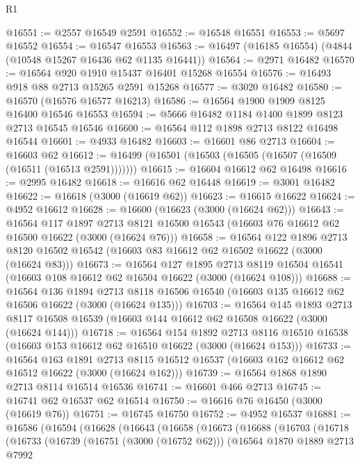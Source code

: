 \begin{lexlean}{R1}
\begin{coremodule}
@16551 := @2557 @16549 @2591
@16552 := @16548 @16551
@16553 := @5697 @16552
@16554 := @16547 @16553
@16563 := @16497 (@16185 @16554) (@4844 (@10548 @15267 @16436 @62 @1135 @16441))
@16564 := @2971 @16482
@16570 := @16564 @920 @1910 @15437 @16401 @15268 @16554
@16576 := @16493 @918 @88 @2713 @15265 @2591 @15268
@16577 := @3020 @16482
@16580 := @16570 (@16576 @16577 @16213)
@16586 := @16564 @1900 @1909 @8125 @16400 @16546 @16553
@16594 := @5666 @16482 @1184 @1400 @1899 @8123 @2713 @16545 @16546
@16600 := @16564 @112 @1898 @2713 @8122 @16498 @16544
@16601 := @4933 @16482
@16603 := @16601 @86 @2713
@16604 := @16603 @62
@16612 := @16499 (@16501 (@16503 (@16505 (@16507 (@16509 (@16511 (@16513 @2591)))))))
@16615 := @16604 @16612 @62 @16498
@16616 := @2995 @16482
@16618 := @16616 @62 @16448
@16619 := @3001 @16482
@16622 := @16618 (@3000 (@16619 @62))
@16623 := @16615 @16622
@16624 := @4952 @16612
@16628 := @16600 (@16623 (@3000 (@16624 @62)))
@16643 := @16564
    @117
    @1897
    @2713
    @8121
    @16500
    @16543
    (@16603 @76 @16612 @62 @16500 @16622 (@3000 (@16624 @76)))
@16658 := @16564
    @122
    @1896
    @2713
    @8120
    @16502
    @16542
    (@16603 @83 @16612 @62 @16502 @16622 (@3000 (@16624 @83)))
@16673 := @16564
    @127
    @1895
    @2713
    @8119
    @16504
    @16541
    (@16603 @108 @16612 @62 @16504 @16622 (@3000 (@16624 @108)))
@16688 := @16564
    @136
    @1894
    @2713
    @8118
    @16506
    @16540
    (@16603 @135 @16612 @62 @16506 @16622 (@3000 (@16624 @135)))
@16703 := @16564
    @145
    @1893
    @2713
    @8117
    @16508
    @16539
    (@16603 @144 @16612 @62 @16508 @16622 (@3000 (@16624 @144)))
@16718 := @16564
    @154
    @1892
    @2713
    @8116
    @16510
    @16538
    (@16603 @153 @16612 @62 @16510 @16622 (@3000 (@16624 @153)))
@16733 := @16564
    @163
    @1891
    @2713
    @8115
    @16512
    @16537
    (@16603 @162 @16612 @62 @16512 @16622 (@3000 (@16624 @162)))
@16739 := @16564 @1868 @1890 @2713 @8114 @16514 @16536
@16741 := @16601 @466 @2713
@16745 := @16741 @62 @16537 @62 @16514
@16750 := @16616 @76 @16450 (@3000 (@16619 @76))
@16751 := @16745 @16750
@16752 := @4952 @16537
@16881 := @16586
    (@16594
      (@16628
        (@16643
          (@16658
            (@16673
              (@16688
                (@16703
                  (@16718
                    (@16733
                      (@16739
                        (@16751 (@3000 (@16752 @62)))
                        (@16564
                          @1870
                          @1889
                          @2713
                          @7992

\end{coremodule}
\end{lexlean}
